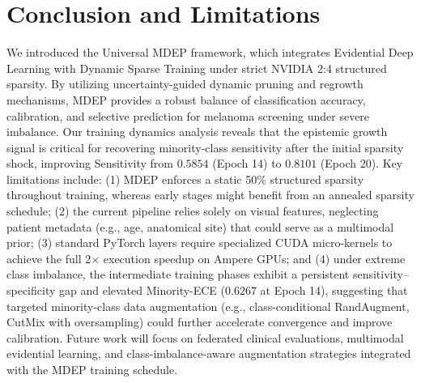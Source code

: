 \documentclass[letterpaper]{article} %
\begin{document}
\section{Conclusion and Limitations}\label{sec:conclusion}
We introduced the Universal MDEP framework, which integrates Evidential Deep Learning with Dynamic Sparse Training under strict NVIDIA 2:4 structured sparsity. By utilizing uncertainty-guided dynamic pruning and regrowth mechanisms, MDEP provides a robust balance of classification accuracy, calibration, and selective prediction for melanoma screening under severe imbalance. Our training dynamics analysis reveals that the epistemic growth signal is critical for recovering minority-class sensitivity after the initial sparsity shock, improving Sensitivity from $0.5854$ (Epoch 14) to $0.8101$ (Epoch 20).
Key limitations include: (1) MDEP enforces a static 50\% structured sparsity throughout training, whereas early stages might benefit from an annealed sparsity schedule; (2) the current pipeline relies solely on visual features, neglecting patient metadata (e.g., age, anatomical site) that could serve as a multimodal prior; (3) standard PyTorch layers require specialized CUDA micro-kernels to achieve the full 2$\times$ execution speedup on Ampere GPUs; and (4) under extreme class imbalance, the intermediate training phases exhibit a persistent sensitivity--specificity gap and elevated Minority-ECE ($0.6267$ at Epoch 14), suggesting that targeted minority-class data augmentation (e.g., class-conditional RandAugment, CutMix with oversampling) could further accelerate convergence and improve calibration. Future work will focus on federated clinical evaluations, multimodal evidential learning, and class-imbalance-aware augmentation strategies integrated with the MDEP training schedule.
\end{document}

